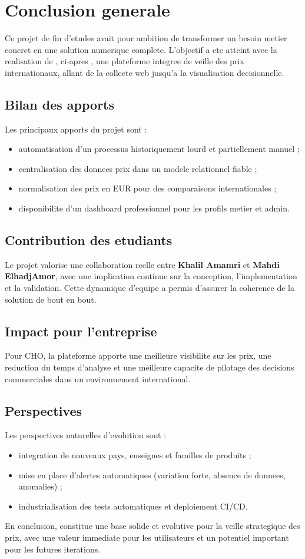 \chapter*{Conclusion generale}

Ce projet de fin d'etudes avait pour ambition de transformer un besoin metier concret en une solution numerique complete. L'objectif a ete atteint avec la realisation de \textbf{\ProjectOfficialTitle}, ci-apres \textbf{\ProjectName}, une plateforme integree de veille des prix internationaux, allant de la collecte web jusqu'a la visualisation decisionnelle.

\section*{Bilan des apports}
Les principaux apports du projet sont :
\begin{itemize}[leftmargin=1.2cm]
	\item automatisation d'un processus historiquement lourd et partiellement manuel ;
	\item centralisation des donnees prix dans un modele relationnel fiable ;
	\item normalisation des prix en EUR pour des comparaisons internationales ;
	\item disponibilite d'un dashboard professionnel pour les profils metier et admin.
\end{itemize}

\section*{Contribution des etudiants}
Le projet valorise une collaboration reelle entre \textbf{Khalil Amamri} et \textbf{Mahdi ElhadjAmor}, avec une implication continue sur la conception, l'implementation et la validation. Cette dynamique d'equipe a permis d'assurer la coherence de la solution de bout en bout.

\section*{Impact pour l'entreprise}
Pour CHO, la plateforme apporte une meilleure visibilite sur les prix, une reduction du temps d'analyse et une meilleure capacite de pilotage des decisions commerciales dans un environnement international.

\section*{Perspectives}
Les perspectives naturelles d'evolution sont :
\begin{itemize}[leftmargin=1.2cm]
	\item integration de nouveaux pays, enseignes et familles de produits ;
	\item mise en place d'alertes automatiques (variation forte, absence de donnees, anomalies) ;
	\item industrialisation des tests automatiques et deploiement CI/CD.
\end{itemize}

En conclusion, \ProjectName{} constitue une base solide et evolutive pour la veille strategique des prix, avec une valeur immediate pour les utilisateurs et un potentiel important pour les futures iterations.

\clearpage
